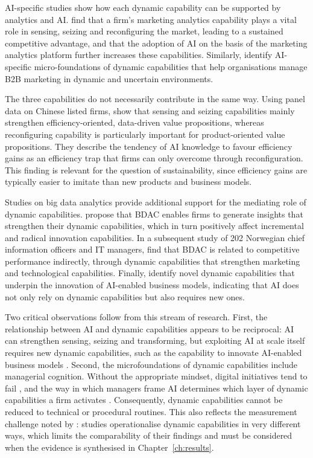 AI-specific studies show how each dynamic capability can be supported by analytics and AI. \textcite[240]{hossain2022} find that a firm's marketing analytics capability plays a vital role in sensing, seizing and reconfiguring the market, leading to a sustained competitive advantage, and that the adoption of AI on the basis of the marketing analytics platform further increases these capabilities. Similarly, \textcite[80]{mikalef2021b2b} identify AI-specific micro-foundations of dynamic capabilities that help organisations manage B2B marketing in dynamic and uncertain environments.

The three capabilities do not necessarily contribute in the same way. Using panel data on Chinese listed firms, \textcite[1]{huang2026} show that sensing and seizing capabilities mainly strengthen efficiency-oriented, data-driven value propositions, whereas reconfiguring capability is particularly important for product-oriented value propositions. They describe the tendency of AI knowledge to favour efficiency gains as an efficiency trap that firms can only overcome through reconfiguration. This finding is relevant for the question of sustainability, since efficiency gains are typically easier to imitate than new products and business models.

Studies on big data analytics provide additional support for the mediating role of dynamic capabilities. \textcite[272]{mikalef2019} propose that BDAC enables firms to generate insights that strengthen their dynamic capabilities, which in turn positively affect incremental and radical innovation capabilities. In a subsequent study of 202 Norwegian chief information officers and IT managers, \textcite[1]{mikalef2020} find that BDAC is related to competitive performance indirectly, through dynamic capabilities that strengthen marketing and technological capabilities. Finally, \textcite[1]{sjodin2023} identify novel dynamic capabilities that underpin the innovation of AI-enabled business models, indicating that AI does not only rely on dynamic capabilities but also requires new ones.

Two critical observations follow from this stream of research. First, the relationship between AI and dynamic capabilities appears to be reciprocal: AI can strengthen sensing, seizing and transforming, but exploiting AI at scale itself requires new dynamic capabilities, such as the capability to innovate AI-enabled business models \parencite[1]{sjodin2023}. Second, the microfoundations of dynamic capabilities include managerial cognition. Without the appropriate mindset, digital initiatives tend to fail \parencite[1]{volberda2021}, and the way in which managers frame AI determines which layer of dynamic capabilities a firm activates \parencite[1]{wu2026}. Consequently, dynamic capabilities cannot be reduced to technical or procedural routines. This also reflects the measurement challenge noted by \textcite[390]{schilke2018}: studies operationalise dynamic capabilities in very different ways, which limits the comparability of their findings and must be considered when the evidence is synthesised in Chapter~\ref{ch:results}.

